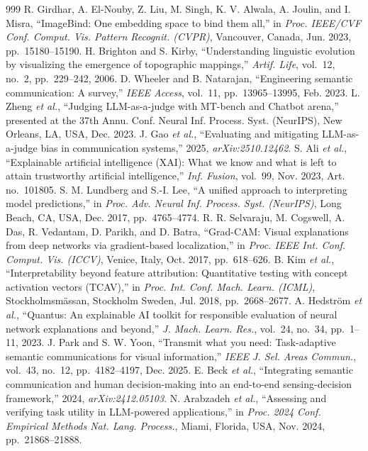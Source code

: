 \begin{thebibliography}{999}
 R. Girdhar, A. El-Nouby, Z. Liu, M. Singh, K. V. Alwala, A. Joulin, and I. Misra, ``ImageBind: One embedding space to bind them all,'' in \emph{Proc. IEEE/CVF Conf. Comput. Vis. Pattern Recognit. (CVPR)}, Vancouver, Canada, Jun. 2023, pp.~15180--15190.
 H. Brighton and S. Kirby, ``Understanding linguistic evolution by visualizing the emergence of topographic mappings,'' \emph{Artif. Life}, vol.~12, no.~2, pp.~229--242, 2006.
 D. Wheeler and B. Natarajan, ``Engineering semantic communication: A survey,'' \emph{IEEE Access}, vol.~11, pp.~13965--13995, Feb. 2023.
 L. Zheng \emph{et al.}, ``Judging LLM-as-a-judge with MT-bench and Chatbot arena,'' presented at the 37th Annu. Conf. Neural Inf. Process. Syst. (NeurIPS), New Orleans, LA, USA, Dec. 2023.
 J. Gao \emph{et al.}, ``Evaluating and mitigating LLM-as-a-judge bias in communication systems,'' 2025, \emph{arXiv:2510.12462}.
 S. Ali \emph{et al.}, ``Explainable artificial intelligence (XAI): What we know and what is left to attain trustworthy artificial intelligence,'' \emph{Inf. Fusion}, vol.~99, Nov. 2023, Art. no.~101805.
 S. M. Lundberg and S.-I. Lee, ``A unified approach to interpreting model predictions,'' in \emph{Proc. Adv. Neural Inf. Process. Syst. (NeurIPS)}, Long Beach, CA, USA, Dec. 2017, pp.~4765--4774.
 R. R. Selvaraju, M. Cogswell, A. Das, R. Vedantam, D. Parikh, and D. Batra, ``Grad-CAM: Visual explanations from deep networks via gradient-based localization,'' in \emph{Proc. IEEE Int. Conf. Comput. Vis. (ICCV)}, Venice, Italy, Oct. 2017, pp.~618--626.
 B. Kim \emph{et al.}, ``Interpretability beyond feature attribution: Quantitative testing with concept activation vectors (TCAV),'' in \emph{Proc. Int. Conf. Mach. Learn. (ICML)}, Stockholmsmässan, Stockholm Sweden, Jul. 2018, pp.~2668--2677.
 A. Hedström \emph{et al.}, ``Quantus: An explainable AI toolkit for responsible evaluation of neural network explanations and beyond,'' \emph{J. Mach. Learn. Res.}, vol.~24, no.~34, pp.~1--11, 2023.
 J. Park and S. W. Yoon, ``Transmit what you need: Task-adaptive semantic communications for visual information,'' \emph{IEEE J. Sel. Areas Commun.}, vol.~43, no.~12, pp.~4182--4197, Dec. 2025.
 E. Beck \emph{et al.}, ``Integrating semantic communication and human decision-making into an end-to-end sensing-decision framework,'' 2024, \emph{arXiv:2412.05103}.
 N. Arabzadeh \emph{et al.}, ``Assessing and verifying task utility in LLM-powered applications,'' in \emph{Proc. 2024 Conf. Empirical Methods Nat. Lang. Process.}, Miami, Florida, USA, Nov. 2024, pp.~21868--21888.

\end{thebibliography}
